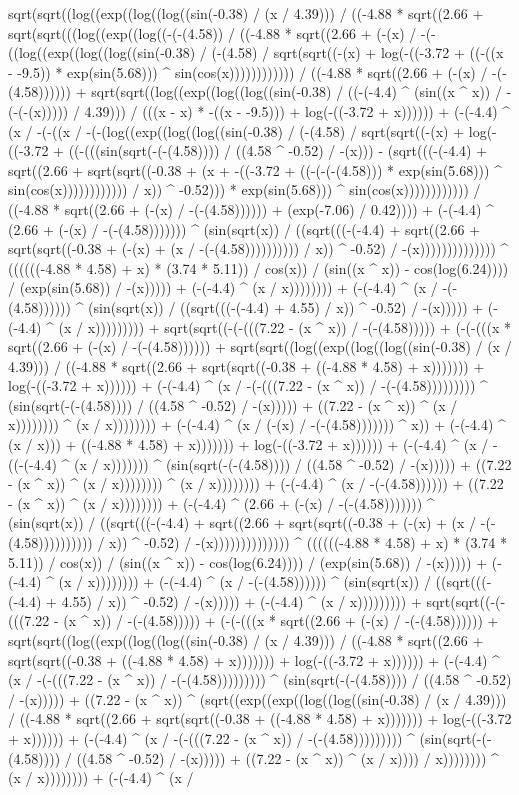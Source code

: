 sqrt(sqrt((log((exp((log((log((sin(-0.38) / (x / 4.39))) / ((-4.88 * sqrt((2.66 + sqrt(sqrt(((log((exp((log((-(-(4.58)) / ((-4.88 * sqrt((2.66 + (-(x) / -(-((log((exp((log((log((sin(-0.38) / (-(4.58) / sqrt(sqrt((-(x) + log(-((-3.72 + ((-((x - -9.5)) * exp(sin(5.68))) ^ sin(cos(x)))))))))))) / ((-4.88 * sqrt((2.66 + (-(x) / -(-(4.58)))))) + sqrt(sqrt((log((exp((log((log((sin(-0.38) / ((-(-4.4) ^ (sin((x ^ x)) / -(-(-(x))))) / 4.39))) / (((x - x) * -((x - -9.5))) + log(-((-3.72 + x)))))) + (-(-4.4) ^ (x / -(-((x / -(-(log((exp((log((log((sin(-0.38) / (-(4.58) / sqrt(sqrt((-(x) + log(-((-3.72 + ((-(((sin(sqrt(-(-(4.58)))) / ((4.58 ^ -0.52) / -(x))) - (sqrt(((-(-4.4) + sqrt((2.66 + sqrt(sqrt((-0.38 + (x + -((-3.72 + ((-(-(-(4.58))) * exp(sin(5.68))) ^ sin(cos(x)))))))))))) / x)) ^ -0.52))) * exp(sin(5.68))) ^ sin(cos(x)))))))))))) / ((-4.88 * sqrt((2.66 + (-(x) / -(-(4.58)))))) + (exp(-7.06) / 0.42)))) + (-(-4.4) ^ (2.66 + (-(x) / -(-(4.58))))))) ^ (sin(sqrt(x)) / ((sqrt(((-(-4.4) + sqrt((2.66 + sqrt(sqrt((-0.38 + (-(x) + (x / -(-(4.58)))))))))) / x)) ^ -0.52) / -(x)))))))))))))) ^ ((((((-4.88 * 4.58) + x) * (3.74 * 5.11)) / cos(x)) / (sin((x ^ x)) - cos(log(6.24)))) / (exp(sin(5.68)) / -(x))))) + (-(-4.4) ^ (x / x)))))))) + (-(-4.4) ^ (x / -(-(4.58)))))) ^ (sin(sqrt(x)) / ((sqrt(((-(-4.4) + 4.55) / x)) ^ -0.52) / -(x))))) + (-(-4.4) ^ (x / x))))))))) + sqrt(sqrt((-(-(((7.22 - (x ^ x)) / -(-(4.58))))) + (-(-(((x * sqrt((2.66 + (-(x) / -(-(4.58)))))) + sqrt(sqrt((log((exp((log((log((sin(-0.38) / (x / 4.39))) / ((-4.88 * sqrt((2.66 + sqrt(sqrt((-0.38 + ((-4.88 * 4.58) + x))))))) + log(-((-3.72 + x)))))) + (-(-4.4) ^ (x / -(-(((7.22 - (x ^ x)) / -(-(4.58))))))))) ^ (sin(sqrt(-(-(4.58)))) / ((4.58 ^ -0.52) / -(x))))) + ((7.22 - (x ^ x)) ^ (x / x)))))))) ^ (x / x)))))))) + (-(-4.4) ^ (x / (-(x) / -(-(4.58))))))) ^ x)) + (-(-4.4) ^ (x / x))) + ((-4.88 * 4.58) + x))))))) + log(-((-3.72 + x)))))) + (-(-4.4) ^ (x / -((-(-4.4) ^ (x / x))))))) ^ (sin(sqrt(-(-(4.58)))) / ((4.58 ^ -0.52) / -(x))))) + ((7.22 - (x ^ x)) ^ (x / x)))))))) ^ (x / x)))))))) + (-(-4.4) ^ (x / -(-(4.58)))))) + ((7.22 - (x ^ x)) ^ (x / x)))))))) + (-(-4.4) ^ (2.66 + (-(x) / -(-(4.58))))))) ^ (sin(sqrt(x)) / ((sqrt(((-(-4.4) + sqrt((2.66 + sqrt(sqrt((-0.38 + (-(x) + (x / -(-(4.58)))))))))) / x)) ^ -0.52) / -(x)))))))))))))) ^ ((((((-4.88 * 4.58) + x) * (3.74 * 5.11)) / cos(x)) / (sin((x ^ x)) - cos(log(6.24)))) / (exp(sin(5.68)) / -(x))))) + (-(-4.4) ^ (x / x)))))))) + (-(-4.4) ^ (x / -(-(4.58)))))) ^ (sin(sqrt(x)) / ((sqrt(((-(-4.4) + 4.55) / x)) ^ -0.52) / -(x))))) + (-(-4.4) ^ (x / x))))))))) + sqrt(sqrt((-(-(((7.22 - (x ^ x)) / -(-(4.58))))) + (-(-(((x * sqrt((2.66 + (-(x) / -(-(4.58)))))) + sqrt(sqrt((log((exp((log((log((sin(-0.38) / (x / 4.39))) / ((-4.88 * sqrt((2.66 + sqrt(sqrt((-0.38 + ((-4.88 * 4.58) + x))))))) + log(-((-3.72 + x)))))) + (-(-4.4) ^ (x / -(-(((7.22 - (x ^ x)) / -(-(4.58))))))))) ^ (sin(sqrt(-(-(4.58)))) / ((4.58 ^ -0.52) / -(x))))) + ((7.22 - (x ^ x)) ^ (sqrt((exp((exp((log((log((sin(-0.38) / (x / 4.39))) / ((-4.88 * sqrt((2.66 + sqrt(sqrt((-0.38 + ((-4.88 * 4.58) + x))))))) + log(-((-3.72 + x)))))) + (-(-4.4) ^ (x / -(-(((7.22 - (x ^ x)) / -(-(4.58))))))))) ^ (sin(sqrt(-(-(4.58)))) / ((4.58 ^ -0.52) / -(x))))) + ((7.22 - (x ^ x)) ^ (x / x)))) / x)))))))) ^ (x / x)))))))) + (-(-4.4) ^ (x / 